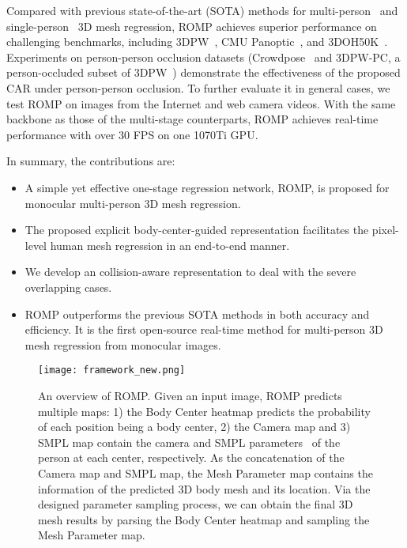 \documentclass[10pt,twocolumn,letterpaper]{article}
\begin{document}
Compared with previous state-of-the-art (SOTA) methods for multi-person~\cite{jiang2020coherent,zanfir2018monocular,zanfir2018deep} and single-person~\cite{kocabas2020vibe,kolotouros2019spin,zhang2020object} 3D mesh regression, ROMP 
achieves superior performance on challenging benchmarks, including 3DPW~\cite{3dpw}, CMU Panoptic~\cite{cmu_panoptic}, and 3DOH50K~\cite{zhang2020object}. 
Experiments on person-person occlusion datasets (Crowdpose~\cite{crowdpose} and 3DPW-PC, a person-occluded subset of 3DPW~\cite{3dpw}) demonstrate the effectiveness of the proposed CAR under person-person occlusion.  
To further evaluate it in general cases, we test ROMP on images from the Internet and web camera videos. 
With the same backbone as those of the multi-stage counterparts, ROMP achieves real-time performance with over 30 FPS on one 1070Ti GPU.

In summary, the contributions are:
\begin{itemize}[itemsep=-2pt,topsep=2pt]\item A simple yet effective one-stage regression network, ROMP, is proposed for monocular multi-person 3D mesh regression.
\item The proposed explicit body-center-guided representation facilitates the pixel-level human mesh regression in an end-to-end manner.
\item We develop an collision-aware representation to deal with the severe overlapping cases.
\item ROMP outperforms the previous SOTA methods in both accuracy and efficiency. It is the first open-source real-time method for multi-person 3D mesh regression from monocular images.
\end{itemize}

\begin{figure*}[t]
	\centering
	\texttt{[image: framework\_new.png]}
	\caption{An overview of ROMP. Given an input image, ROMP predicts multiple maps: 1) the Body Center heatmap  predicts the probability of each position being a body center, 2) the Camera map and 3) SMPL map  contain the camera and SMPL parameters~\cite{SMPL} of the person at each center, respectively. As the concatenation of the Camera map and SMPL map, the Mesh Parameter map contains the information of the predicted 3D body mesh and its location. Via the designed parameter sampling process, we can obtain the final 3D mesh results by parsing the Body Center heatmap and sampling the Mesh Parameter map.
}\vspace{-3mm}
	\label{fig:framework}
\end{figure*}
\newcommand{\squeezeup}{\vspace{-3mm}}
\end{document}
